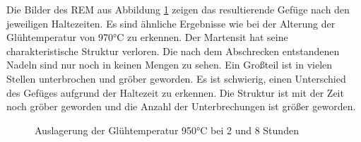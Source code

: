 \documentclass[a4paper, 11pt]{tubsreprt}
\begin{document}
Die Bilder des REM aus Abbildung \ref{REM 950 2 und 8} zeigen das resultierende Gefüge nach den jeweiligen Haltezeiten. Es sind ähnliche Ergebnisse wie bei der Alterung der Glühtemperatur von 970°C zu erkennen. Der Martensit hat seine charakteristische Struktur verloren. Die nach dem Abschrecken entstandenen Nadeln sind nur noch in keinen Mengen zu sehen. Ein Großteil ist in vielen Stellen unterbrochen und gröber geworden. Es ist schwierig, einen Unterschied des Gefüges aufgrund der Haltezeit zu erkennen. Die Struktur ist mit der Zeit noch gröber geworden und die Anzahl der Unterbrechungen ist größer geworden.
\begin{figure}
\label{REM 950 2 und 8}
\caption{Auslagerung der Glühtemperatur 950°C bei 2 und 8 Stunden}
\end{figure}
\end{document}
